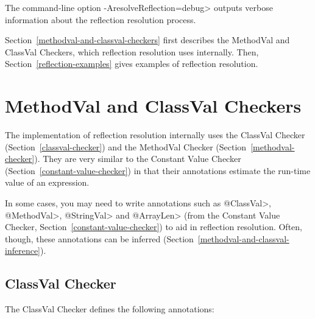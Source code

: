 The command-line option \<-AresolveReflection=debug> outputs verbose information about the reflection resolution process.


Section~\ref{methodval-and-classval-checkers} first describes the MethodVal
and ClassVal Checkers, which reflection resolution uses internally.  Then,
Section~\ref{reflection-examples} gives examples of reflection resolution.


\section{MethodVal and ClassVal Checkers\label{methodval-and-classval-checkers}}

The implementation of reflection resolution internally uses the ClassVal
Checker (Section~\ref{classval-checker}) and the MethodVal Checker
(Section~\ref{methodval-checker}).  They are very similar to the Constant
Value Checker (Section~\ref{constant-value-checker}) in that their
annotations estimate the run-time value of an expression.

In some cases, you may need to write annotations such as \<@ClassVal>,
\<@MethodVal>, \<@StringVal> and \<@ArrayLen> (from the Constant Value Checker,
Section~\ref{constant-value-checker}) to aid in reflection resolution.
Often, though, these annotations can be inferred
(Section~\ref{methodval-and-classval-inference}).


\subsection{ClassVal Checker\label{classval-checker}}

The ClassVal Checker defines the following annotations:

